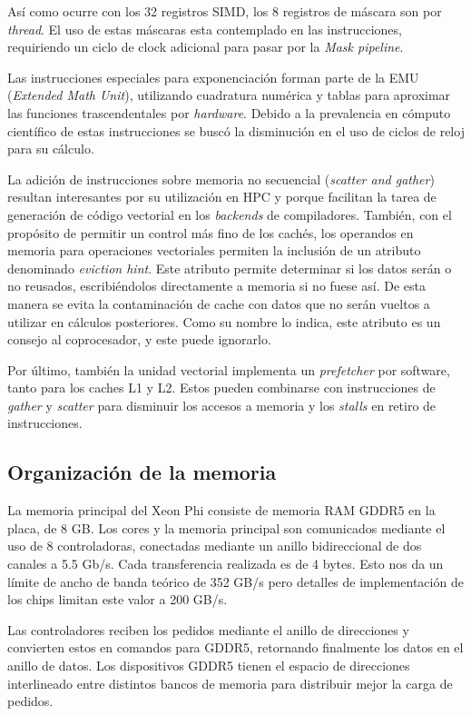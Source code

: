 As\'i como ocurre con los 32 registros SIMD, los 8 registros de m\'ascara son
por \textit{thread}. El uso de estas m\'ascaras esta contemplado en las instrucciones, requiriendo un ciclo de clock adicional
para pasar por la \textit{Mask pipeline}.

Las instrucciones especiales para exponenciaci\'on forman parte de la EMU (\textit{Extended Math Unit}), utilizando cuadratura
num\'erica y tablas para aproximar las funciones trascendentales por \textit{hardware}. Debido a la prevalencia en c\'omputo
cient\'ifico de estas instrucciones se busc\'o la disminuci\'on en el uso de ciclos de reloj para su c\'alculo.

La adici\'on de instrucciones sobre memoria no secuencial (\textit{scatter and gather}) resultan interesantes por su utilizaci\'on
en HPC y porque facilitan la tarea de generaci\'on de c\'odigo vectorial en los \textit{backends} de compiladores. Tambi\'en, con
el prop\'osito de permitir un control m\'as fino de los cach\'es, los operandos en memoria para operaciones vectoriales permiten
la inclusi\'on de un atributo denominado \textit{eviction hint}. Este atributo permite determinar si los datos ser\'an o no
reusados, escribi\'endolos directamente a memoria si no fuese as\'i. De esta manera se evita la contaminaci\'on de cache con datos
que no ser\'an vueltos a utilizar en c\'alculos posteriores. Como su nombre lo indica, este atributo es un consejo al coprocesador,
y este puede ignorarlo.

Por \'ultimo, tambi\'en la unidad vectorial implementa un \textit{prefetcher} por software, tanto para los caches L1 y L2. Estos
pueden combinarse con instrucciones de \textit{gather} y \textit{scatter} para disminuir los accesos a memoria y los \textit{stalls}
en retiro de instrucciones.

\subsection{Organizaci\'on de la memoria}

La memoria principal del Xeon Phi consiste de memoria RAM GDDR5 en la placa, de 8 GB. Los cores y la memoria principal son comunicados mediante el uso de 8
controladoras, conectadas mediante un anillo bidireccional de dos canales a 5.5 Gb/s. Cada transferencia realizada es de 4 bytes.
Esto nos da un l\'imite de ancho de banda te\'orico de 352 GB/s pero detalles de implementaci\'on de los chips limitan este valor a 200 GB/s.

Las controladores reciben los pedidos mediante el anillo de direcciones y convierten estos en comandos para GDDR5, retornando finalmente los datos en
el anillo de datos. Los dispositivos GDDR5 tienen el espacio de direcciones interlineado entre distintos bancos de memoria para distribuir mejor la carga de pedidos.

